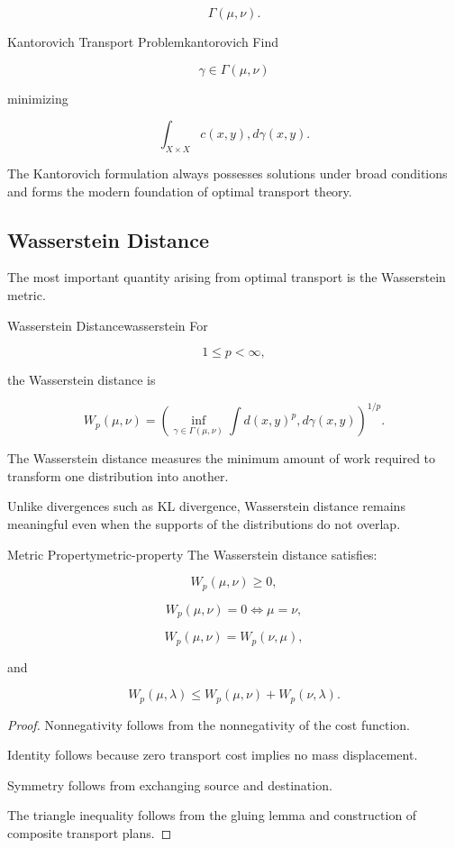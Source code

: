 \documentclass[12pt,twoside,openright]{book}
\begin{document}
\[
\Gamma(\mu,\nu).
\]

\begin{definition}{Kantorovich Transport Problem}{kantorovich}
Find

\[
\gamma
\in
\Gamma(\mu,\nu)
\]

minimizing

\[
\int_{X\times X}
c(x,y)
,d\gamma(x,y).
\]
\end{definition}

The Kantorovich formulation always possesses solutions
under broad conditions and forms the modern foundation of
optimal transport theory.

\subsection{Wasserstein Distance}

The most important quantity arising from optimal transport
is the Wasserstein metric.

\begin{definition}{Wasserstein Distance}{wasserstein}
For

\[
1\le p<\infty,
\]

the Wasserstein distance is

\[
W_p(\mu,\nu)
=

\left(
\inf_{\gamma\in\Gamma(\mu,\nu)}
\int
d(x,y)^p
,d\gamma(x,y)
\right)^{1/p}.
\]
\end{definition}

The Wasserstein distance measures the minimum amount of
work required to transform one distribution into another.

Unlike divergences such as KL divergence, Wasserstein
distance remains meaningful even when the supports of the
distributions do not overlap.

\begin{theorem}{Metric Property}{metric-property}
The Wasserstein distance satisfies:

\[
W_p(\mu,\nu)\ge0,
\]

\[
W_p(\mu,\nu)=0
\iff
\mu=\nu,
\]

\[
W_p(\mu,\nu)
=

W_p(\nu,\mu),
\]

and

\[
W_p(\mu,\lambda)
\le
W_p(\mu,\nu)
+
W_p(\nu,\lambda).
\]
\end{theorem}

\begin{proof}
Nonnegativity follows from the nonnegativity of the cost
function.

Identity follows because zero transport cost implies no
mass displacement.

Symmetry follows from exchanging source and destination.

The triangle inequality follows from the gluing lemma and
construction of composite transport plans.
\end{proof}
\end{document}
